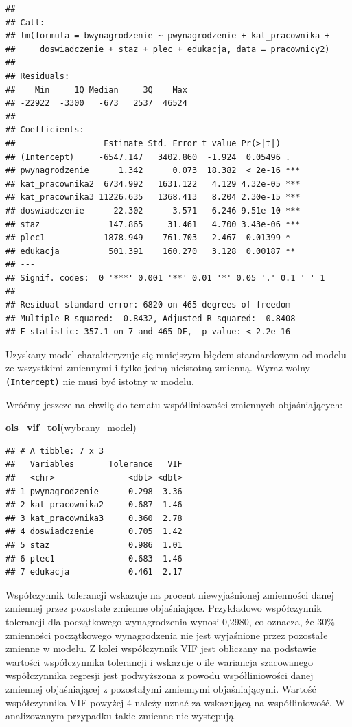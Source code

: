 \documentclass[]{book}
\newenvironment{Shaded}{\begin{snugshade}}{\end{snugshade}}
\newcommand{\KeywordTok}[1]{\textcolor[rgb]{0.13,0.29,0.53}{\textbf{#1}}}
\newcommand{\NormalTok}[1]{#1}
\begin{document}
\begin{verbatim}
## 
## Call:
## lm(formula = bwynagrodzenie ~ pwynagrodzenie + kat_pracownika + 
##     doswiadczenie + staz + plec + edukacja, data = pracownicy2)
## 
## Residuals:
##    Min     1Q Median     3Q    Max 
## -22922  -3300   -673   2537  46524 
## 
## Coefficients:
##                  Estimate Std. Error t value Pr(>|t|)    
## (Intercept)     -6547.147   3402.860  -1.924  0.05496 .  
## pwynagrodzenie      1.342      0.073  18.382  < 2e-16 ***
## kat_pracownika2  6734.992   1631.122   4.129 4.32e-05 ***
## kat_pracownika3 11226.635   1368.413   8.204 2.30e-15 ***
## doswiadczenie     -22.302      3.571  -6.246 9.51e-10 ***
## staz              147.865     31.461   4.700 3.43e-06 ***
## plec1           -1878.949    761.703  -2.467  0.01399 *  
## edukacja          501.391    160.270   3.128  0.00187 ** 
## ---
## Signif. codes:  0 '***' 0.001 '**' 0.01 '*' 0.05 '.' 0.1 ' ' 1
## 
## Residual standard error: 6820 on 465 degrees of freedom
## Multiple R-squared:  0.8432, Adjusted R-squared:  0.8408 
## F-statistic: 357.1 on 7 and 465 DF,  p-value: < 2.2e-16
\end{verbatim}

Uzyskany model charakteryzuje się mniejszym błędem standardowym od modelu ze wszystkimi zmiennymi i tylko jedną nieistotną zmienną. Wyraz wolny \texttt{(Intercept)} nie musi być istotny w modelu.

Wróćmy jeszcze na chwilę do tematu współliniowości zmiennych objaśniających:

\begin{Shaded}
\begin{Highlighting}[]
\KeywordTok{ols_vif_tol}\NormalTok{(wybrany_model)}
\end{Highlighting}
\end{Shaded}

\begin{verbatim}
## # A tibble: 7 x 3
##   Variables       Tolerance   VIF
##   <chr>               <dbl> <dbl>
## 1 pwynagrodzenie      0.298  3.36
## 2 kat_pracownika2     0.687  1.46
## 3 kat_pracownika3     0.360  2.78
## 4 doswiadczenie       0.705  1.42
## 5 staz                0.986  1.01
## 6 plec1               0.683  1.46
## 7 edukacja            0.461  2.17
\end{verbatim}

Współczynnik tolerancji wskazuje na procent niewyjaśnionej zmienności danej zmiennej przez pozostałe zmienne objaśniające. Przykładowo współczynnik tolerancji dla początkowego wynagrodzenia wynosi 0,2980, co oznacza, że 30\% zmienności początkowego wynagrodzenia nie jest wyjaśnione przez pozostałe zmienne w modelu. Z kolei współczynnik VIF jest obliczany na podstawie wartości współczynnika tolerancji i wskazuje o ile wariancja szacowanego współczynnika regresji jest podwyższona z powodu współliniowości danej zmiennej objaśniającej z pozostałymi zmiennymi objaśniającymi. Wartość współczynnika VIF powyżej 4 należy uznać za wskazującą na współliniowość. W analizowanym przypadku takie zmienne nie występują.
\end{document}
